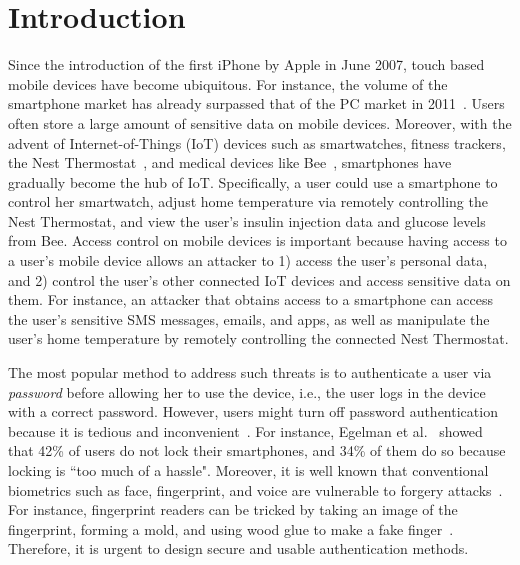\documentclass{sig-alternate-05-2015}
\begin{document}




\printccsdesc






\section{Introduction}

Since the introduction of the first iPhone by Apple in June 2007, touch based
mobile devices have become ubiquitous. For instance,  the volume of the
smartphone market has already surpassed that of the PC market in
2011~\cite{smartphoneMorethanPC}. Users often store a large amount of sensitive
data on mobile devices. Moreover, with the advent of Internet-of-Things (IoT)
devices such as smartwatches, fitness trackers, the Nest Thermostat~\cite{Nest},
and medical devices like Bee~\cite{Bee}, smartphones have gradually become the
hub of IoT. Specifically, a user could use a smartphone to control her
smartwatch, adjust home temperature via remotely controlling the Nest
Thermostat, and view the user's insulin injection data and glucose levels from
Bee. Access control on mobile devices is important because having access to a
user's mobile device allows an attacker to 1) access the user's personal data,
and 2) control the user's other connected IoT devices and access sensitive data
on them. For instance, an attacker that obtains access to a smartphone can
access the user's sensitive SMS messages, emails, and apps, as well as manipulate the user's home temperature by remotely
controlling the connected Nest Thermostat.  
 
 
 The most popular method to address such threats is to authenticate a user via
\emph{password} before allowing her to use the device, i.e., the user logs in
the device with a correct password. However,  users might turn off password
authentication because it is tedious and
inconvenient~\cite{NolockSOUPS13,whylockCCS14,sophos}. For instance,  Egelman et
al.~\cite{whylockCCS14} showed that 42\% of users do not lock their smartphones,
and 34\% of them do so because locking is ``too much of a hassle". Moreover, it
is well known that  conventional biometrics such as face, fingerprint, and voice
are  vulnerable to forgery
attacks~\cite{AttackingAndroidFaceAuthentication,AttackingAndroidFaceAuthenticationLiveness,fingerprintForgeryAttack}.
For instance, fingerprint readers can be tricked by taking an image of the
fingerprint, forming a mold, and using wood glue to make a fake
finger~\cite{fingerprintForgeryAttack}. Therefore, it is urgent to design secure
and usable authentication methods. 
 
\end{document}
